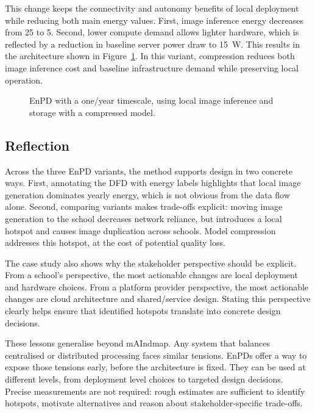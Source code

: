\documentclass[11pt,a4paper]{article}
\begin{document}
This change keeps the connectivity and autonomy benefits of local deployment while reducing both main energy values.
First, image inference energy decreases from \qty{25}{\watthour} to \qty{5}{\watthour}.
Second, lower compute demand allows lighter hardware, which is reflected by a reduction in baseline server power draw to \qty{15}{\watt}.
This results in the architecture shown in Figure~\ref{fig:epd-prune}.
In this variant, compression reduces both image inference cost and baseline infrastructure demand while preserving local operation.

\begin{figure}[ht]
  \centering
  \caption{EnPD with a one\-/year timescale, using local image inference and storage with a compressed model.}%
  \label{fig:epd-prune}
\end{figure}

\subsection{Reflection}
Across the three EnPD variants, the method supports design in two concrete ways.
First, annotating the DFD with energy labels highlights that local image generation dominates yearly energy, which is not obvious from the data flow alone.
Second, comparing variants makes trade-offs explicit: moving image generation to the school decreases network reliance, but introduces a local hotspot and causes image duplication across schools.
Model compression addresses this hotspot, at the cost of potential quality loss.

The case study also shows why the stakeholder perspective should be explicit.
From a school's perspective, the most actionable changes are local deployment and hardware choices.
From a platform provider perspective, the most actionable changes are cloud architecture and shared\-/service design.
Stating this perspective clearly helps ensure that identified hotspots translate into concrete design decisions.

These lessons generalise beyond mAIndmap.
Any system that balances centralised or distributed processing faces similar tensions.
EnPDs offer a way to expose those tensions early, before the architecture is fixed.
They can be used at different levels, from deployment level choices to targeted design decisions.
Precise measurements are not required: rough estimates are sufficient to identify hotspots, motivate alternatives and reason about stakeholder-specific trade-offs.
\end{document}
